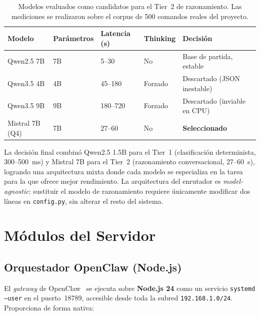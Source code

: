 \begin{table}[ht]
\centering
\small
\setlength{\tabcolsep}{5pt}
\begin{tabular}{|p{2.8cm}|p{2.0cm}|p{1.6cm}|p{2.0cm}|p{3.5cm}|}
\hline
\textbf{Modelo} & \textbf{Parámetros} & \textbf{Latencia (s)} & \textbf{Thinking} & \textbf{Decisión} \\
\hline
Qwen2.5 7B & 7B & 5--30 & No & Base de partida, estable \\
Qwen3.5 4B & 4B & 45--180 & Forzado & Descartado (JSON inestable) \\
Qwen3.5 9B & 9B & 180--720 & Forzado & Descartado (inviable en CPU) \\
Mistral 7B (Q4) & 7B & 27--60 & No & \textbf{Seleccionado} \\
\hline
\end{tabular}
\caption{Modelos evaluados como candidatos para el Tier~2 de razonamiento. Las mediciones se realizaron sobre el corpus de 500 comandos reales del proyecto.}
\label{tab:modelos_evaluados_tier2}
\end{table}

La decisión final combinó Qwen2.5 1.5B para el Tier~1 (clasificación determinista, 300--500~ms) y Mistral 7B para el Tier~2 (razonamiento conversacional, 27--60~s), logrando una arquitectura mixta donde cada modelo se especializa en la tarea para la que ofrece mejor rendimiento. La arquitectura del enrutador es \textit{model-agnostic}: sustituir el modelo de razonamiento requiere únicamente modificar dos líneas en \texttt{config.py}, sin alterar el resto del sistema.

\section{Módulos del Servidor}

\subsection{Orquestador OpenClaw (Node.js)}

El \textit{gateway} de OpenClaw~\cite{openclaw} se ejecuta sobre \textbf{Node.js 24} como un servicio \texttt{systemd --user} en el puerto~18789, accesible desde toda la subred \texttt{192.168.1.0/24}. Proporciona de forma nativa:

